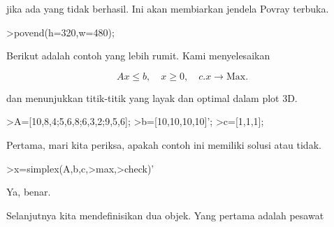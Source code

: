 \documentclass[12pt,Times new roman,letterpaper]{book}
\begin{document}
\begin{eulernootebook}
\begin{eulercomment}
\begin{eulercomment}
\begin{eulernootebook}
\begin{eulercomment}
\begin{eulercomment}
\begin{eulercomment}
\begin{eulercomment}
\begin{eulercomment}
\begin{eulercomment}
\begin{eulercomment}
\begin{eulernotebook}
\begin{eulercomment}
jika ada yang tidak berhasil. Ini akan membiarkan jendela Povray
terbuka.
\end{eulercomment}
\begin{eulerprompt}
>povend(h=320,w=480);
\end{eulerprompt}
\begin{eulercomment}
Berikut adalah contoh yang lebih rumit. Kami menyelesaikan

\end{eulercomment}
\begin{eulerformula}
\[
Ax \le b, \quad x \ge 0, \quad c.x \to \text{Max.}
\]
\end{eulerformula}
\begin{eulercomment}
dan menunjukkan titik-titik yang layak dan optimal dalam plot 3D.
\end{eulercomment}
\begin{eulerprompt}
>A=[10,8,4;5,6,8;6,3,2;9,5,6];
>b=[10,10,10,10]';
>c=[1,1,1];
\end{eulerprompt}
\begin{eulercomment}
Pertama, mari kita periksa, apakah contoh ini memiliki solusi atau
tidak.
\end{eulercomment}
\begin{eulerprompt}
>x=simplex(A,b,c,>max,>check)'
\end{eulerprompt}
\begin{euleroutput}
  [0,  1,  0.5]
\end{euleroutput}
\begin{eulercomment}
Ya, benar.

Selanjutnya kita mendefinisikan dua objek. Yang pertama adalah pesawat


\end{eulercomment}
\end{eulernotebook}
\end{eulercomment}
\end{eulercomment}
\end{eulercomment}
\end{eulercomment}
\end{eulercomment}
\end{eulercomment}
\end{eulercomment}
\end{eulernootebook}
\end{eulercomment}
\end{eulercomment}
\end{eulernootebook}
\end{document}
